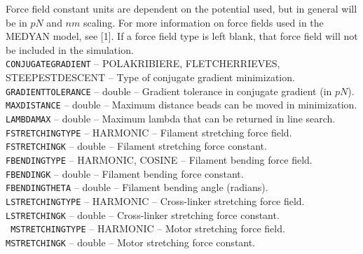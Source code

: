 \documentclass[11pt, oneside]{article}   	%
\begin{document}
\noindent Force field constant units are dependent on the potential used, but in general will be in $pN$ and $nm$ scaling. For more information on force fields used in the MEDYAN model, see [1]. If a force field type is left blank, that force field will not be included in the simulation.\\

\small 
   \noindent \texttt{CONJUGATEGRADIENT} -- POLAKRIBIERE, FLETCHERRIEVES, STEEPESTDESCENT -- Type of conjugate gradient minimization. \\
   
    \noindent \texttt{GRADIENTTOLERANCE} -- double -- Gradient tolerance in conjugate gradient (in $pN$). \\
     
    \noindent  \texttt{MAXDISTANCE} -- double -- Maximum distance beads can be moved in minimization. \\
   
    \noindent  \texttt{LAMBDAMAX} -- double -- Maximum lambda that can be returned in line search. \\
   
    \noindent \texttt{FSTRETCHINGTYPE} -- HARMONIC -- Filament stretching force field. \\
  
    \noindent \texttt{FSTRETCHINGK} -- double -- Filament stretching force constant. \\
   
     \noindent \texttt{FBENDINGTYPE} -- HARMONIC, COSINE -- Filament bending force field. \\
   
     \noindent \texttt{FBENDINGK} -- double -- Filament bending force constant. \\
   
     \noindent \texttt{FBENDINGTHETA} -- double -- Filament bending angle (radians). \\
   
     \noindent \texttt{LSTRETCHINGTYPE} -- HARMONIC -- Cross-linker stretching force field.\\
   
     \noindent  \texttt{LSTRETCHINGK} -- double -- Cross-linker stretching force constant. \\
   
     \noindent \texttt{ MSTRETCHINGTYPE} -- HARMONIC -- Motor stretching force field. \\
   
     \noindent \texttt{MSTRETCHINGK} -- double -- Motor stretching force constant. \\
   
\end{document}
